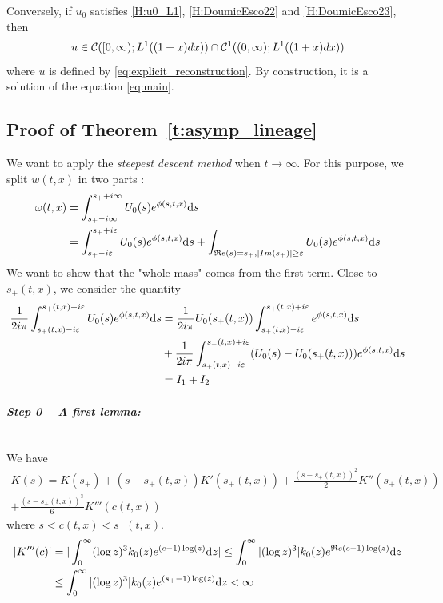 \documentclass[11pt]{amsart}
\renewcommand{\Re}{\mathfrak{R}e}
\begin{document}
Conversely, if $u_0$ satisfies \eqref{H:u0_L1}, \eqref{H:DoumicEsco22} and \eqref{H:DoumicEsco23}, then 
 $$u \in \mathcal{C}([0, \infty); L^1((1+x)dx)) \cap \mathcal{C}^1((0, \infty); L^1((1+x)dx))$$
where $u$ is defined by \eqref{eq:explicit_reconstruction}. By construction, it is a solution of the equation \eqref{eq:main}.

\subsection{Proof of Theorem~\ref{t:asymp_lineage}}
\label{proof:asymp_lineage}

We want to apply the \textit{steepest descent method} when $t \to \infty$. For this purpose, we split $w(t,x)$ in two parts : 
\begin{align*}
    \omega(t,x)
        &= \int_{s_+-i\infty}^{s_++i\infty} U_0(s)e^{\phi(s, t, x)} \ds \\
        &= \int_{s_+-i\varepsilon}^{s_++i\varepsilon} U_0(s) e^{\phi(s, t, x)} \ds 
        +\int_{\Re(s) = s_+, |Im(s_+)| \geq \varepsilon} U_0(s) e^{\phi(s, t, x)} \ds \\
\end{align*}
We want to show that the "whole mass" comes from the first term. Close to $s_+(t,x)$, we consider the quantity
    \begin{align*}
    \frac{1}{2i \pi} \int_{s_+(t,x) - i\varepsilon}^{s_+(t,x) + i\varepsilon} U_0(s) e^{\phi(s,t,x)} \mathrm ds 
    &=
    \frac{1}{2i \pi} U_0(s_+(t,x)) \int_{s_+(t,x) - i\varepsilon}^{s_+(t,x) + i\varepsilon} e^{\phi(s,t,x)} \mathrm ds
    \\
    & + 
    \frac{1}{2i \pi} \int_{s_+(t,x) - i\varepsilon}^{s_+(t,x) + i\varepsilon} (U_0(s) -  U_0(s_+(t,x)))  e^{\phi(s,t,x)} \mathrm ds \\
    &= I_1 + I_2
    \end{align*}

\paragraph{\textit{Step 0 -- A first lemma:}}\mbox{}\\
We have
\begin{equation}
    \begin{split}
    K(s) = K(s_+) + (s - s_+(t,x)) K'(s_+(t,x)) + \frac{(s - s_+(t,x))^2}{2} K''(s_+(t,x)) \\+ \frac{(s - s_+(t,x))^3}{6} K'''(c(t,x))
    \end{split}
\end{equation}
where $s < c(t,x) < s_+(t,x)$.
    \begin{align*}
         |K'''(c)|
         &= |\int_0^\infty (\log z)^3 k_0(z) e^{(c-1)\log(z)}\dz|
         \leq \int_0^\infty |(\log z)^3| k_0(z)  e^{\Re (c-1)\log(z)}\dz \\
         &\leq  \int_0^\infty |(\log z)^3| k_0(z)  e^{(s_+-1)\log(z)}\dz < \infty
    \end{align*}
    
\end{document}
